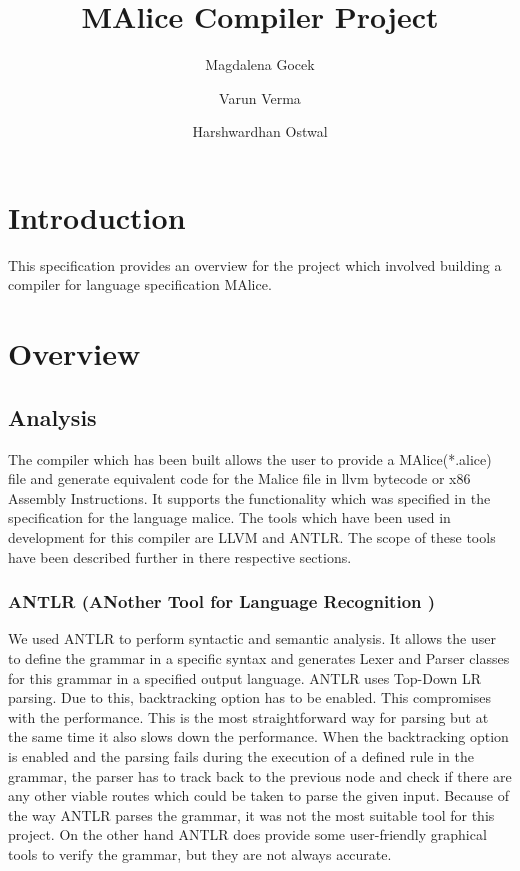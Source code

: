 \documentclass[a4wide, 11pt]{article}
\begin{document}
\title{MAlice Compiler Project}

\author{Magdalena Gocek \and Varun Verma \and Harshwardhan Ostwal}

\maketitle            %

\section{Introduction}
\label{sec:intro}
	This specification provides an overview for the project which involved building a compiler for language specification MAlice.
	
\section{Overview}
	\subsection{Analysis}
		The compiler which has been built allows the user to provide a MAlice(*.alice) file and generate equivalent code
		for the Malice file in llvm bytecode or x86 Assembly Instructions. It supports the functionality which was specified in
		the specification for the language malice. The tools which have been used in development for this compiler are LLVM and ANTLR.
		The scope of these tools have been described further in there respective sections.
		\subsubsection{ANTLR (ANother Tool for Language Recognition )}
			We used ANTLR to perform syntactic and semantic analysis. It allows the user to define the grammar in a 
			specific syntax and generates Lexer and Parser classes for this grammar in a specified output language.
			ANTLR uses Top-Down LR parsing. Due to this, backtracking option has to be enabled. This 
			compromises with the performance. This is the most straightforward way for parsing but at the same
			time it also slows down the performance. When the backtracking option is enabled and the parsing fails during
			the execution of a defined rule in the grammar, the parser has to track back to the previous node and check if there are
			any other viable routes which could be taken to parse the given input. Because of the way ANTLR parses the grammar, it was not the most suitable tool for this project.
			On the other hand ANTLR does provide some user-friendly graphical tools to verify the grammar, but they are not always accurate.
			
\end{document}
